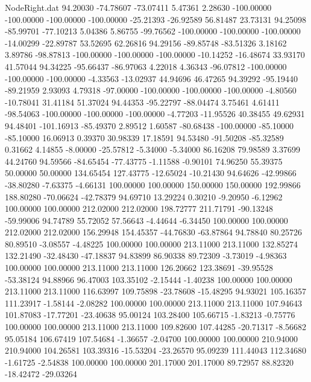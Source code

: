 \begin{filecontents}{NodeRight.dat}
  94.20030  -74.78607  -73.07411     5.47361    2.28630 -100.00000 -100.00000 -100.00000 -100.00000  -25.21393  -26.92589   56.81487   23.73131
  94.25098  -85.99701  -77.10213     5.04386    5.86755  -99.76562 -100.00000 -100.00000 -100.00000  -14.00299  -22.89787   53.52695   62.26816
  94.29156  -89.85748  -83.51326     3.18162    3.89786  -98.87813 -100.00000 -100.00000 -100.00000  -10.14252  -16.48674   33.93170   41.57044
  94.34225  -95.66437  -86.97063     4.22018    4.36343  -96.07812 -100.00000 -100.00000 -100.00000   -4.33563  -13.02937   44.94696   46.47265
  94.39292  -95.19440  -89.21959     2.93093    4.79318  -97.00000 -100.00000 -100.00000 -100.00000   -4.80560  -10.78041   31.41184   51.37024
  94.44353  -95.22797  -88.04474     3.75461    4.61411  -98.54063 -100.00000 -100.00000 -100.00000   -4.77203  -11.95526   40.38455   49.62931
  94.48401 -101.16913  -85.49370     2.89512    1.60587  -80.68438 -100.00000  -85.10000  -85.10000   16.06913    0.39370   30.98339   17.18591
  94.53480  -91.50208  -85.32589     0.31662    4.14855   -8.00000  -25.57812   -5.34000   -5.34000   86.16208   79.98589    3.37699   44.24760
  94.59566  -84.65454  -77.43775    -1.11588   -0.90101   74.96250   55.39375   50.00000   50.00000  134.65454  127.43775  -12.65024  -10.21430
  94.64626  -42.99866  -38.80280    -7.63375   -4.66131  100.00000  100.00000  150.00000  150.00000  192.99866  188.80280  -70.06624  -42.78379
  94.69710   13.29224    0.30210    -9.20950   -6.12962  100.00000  100.00000  212.02000  212.02000  198.72777  211.71791  -90.13248  -59.99006
  94.74789   55.72052   57.56643    -4.44644   -6.34450  100.00000  100.00000  212.02000  212.02000  156.29948  154.45357  -44.76830  -63.87864
  94.78840   80.25726   80.89510    -3.08557   -4.48225  100.00000  100.00000  213.11000  213.11000  132.85274  132.21490  -32.48430  -47.18837
  94.83899   86.90338   89.72309    -3.73019   -4.98363  100.00000  100.00000  213.11000  213.11000  126.20662  123.38691  -39.95528  -53.38124
  94.88966   96.47003  103.35102    -2.15444   -1.40238  100.00000  100.00000  213.11000  213.11000  116.63997  109.75898  -23.78608  -15.48295
  94.93021  105.16357  111.23917    -1.58144   -2.08282  100.00000  100.00000  213.11000  213.11000  107.94643  101.87083  -17.77201  -23.40638
  95.00124  103.28400  105.66715    -1.83213   -0.75776  100.00000  100.00000  213.11000  213.11000  109.82600  107.44285  -20.71317   -8.56682
  95.05184  106.67419  107.54684    -1.36657   -2.04700  100.00000  100.00000  210.94000  210.94000  104.26581  103.39316  -15.53204  -23.26570
  95.09239  111.44043  112.34680    -1.61725   -2.54838  100.00000  100.00000  201.17000  201.17000   89.72957   88.82320  -18.42472  -29.03264

\end{filecontents}

